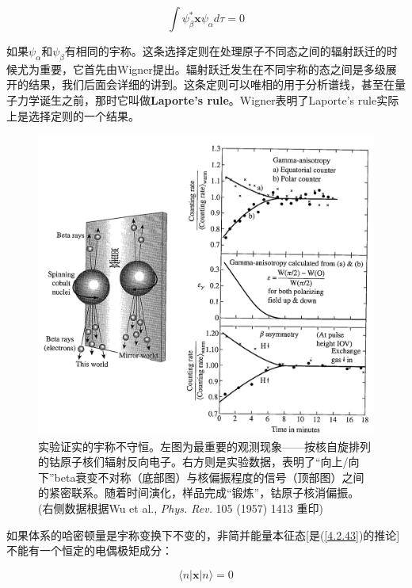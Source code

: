 \documentclass[UTF8,twoside]{ctexart}
\begin{document}
\begin{equation} \label{4.2.43}
\int\psi_{\beta}^*\bm{x}\psi_{\alpha}d\tau = 0
\end{equation}

\noindent 如果$\psi_{\alpha}$和$\psi_{\beta}$有相同的宇称。这条选择定则在处理原子不同态之间的辐射跃迁的时候尤为重要，它首先由Wigner提出。辐射跃迁发生在不同宇称的态之间是多级展开的结果，我们后面会详细的讲到。这条定则可以唯相的用于分析谱线，甚至在量子力学诞生之前，那时它叫做\textbf{Laporte's rule}。Wigner表明了Laporte's rule实际上是选择定则的一个结果。

\begin{figure}[!h]
\begin{centering}
\includegraphics[width = 12.4cm]{./Sakurai/Fig_4.6.png}
\caption{实验证实的宇称不守恒。左图为最重要的观测现象——按核自旋排列的钴原子核们辐射反向电子。右方则是实验数据，表明了“向上/向下”beta衰变不对称（底部图）与核偏振程度的信号（顶部图）之间的紧密联系。随着时间演化，样品完成“锻炼”，钴原子核消偏振。(右侧数据根据Wu et al., \emph{Phys. Rev. }105 (1957) 1413 重印)}
\label {Fig4.6}
\end{centering}
\end{figure}

如果体系的哈密顿量是宇称变换下不变的，非简并能量本征态[是(\ref{4.2.43})的推论]不能有一个恒定的电偶极矩成分：

\begin{equation}
\langle n|\bm{x}|n\rangle = 0
\end{equation}
\end{document}
